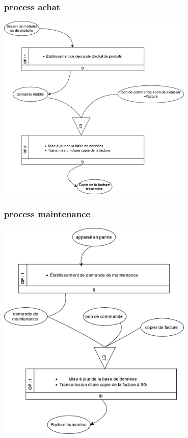 \subsubsection{process achat}
\includegraphics[width=0.7\textwidth]{chapter/Conceptual Study/processus/achat.mct.png}
\subsubsection{process maintenance}
\includegraphics[width=0.7\textwidth]{chapter/Conceptual Study/processus/maintenance.mct.png}
